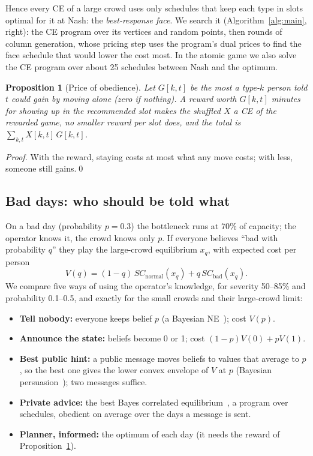 \documentclass{article}
\newtheorem{proposition}{Proposition}
\begin{document}
\smallskip
Hence every CE of a large crowd uses only schedules that keep each type in slots optimal for it at Nash: the
\emph{best-response face}. We search it (Algorithm~\ref{alg:main}, right): the CE program over its vertices and
\RfaceSamples{} random points, then \RfaceRounds{} rounds of column generation, whose pricing step uses the program's
dual prices to find the face schedule that would lower the cost most. In the atomic game we also solve the CE program
over about 25 schedules between Nash and the optimum.

\begin{proposition}[Price of obedience]\label{p3}
Let $G[k,t]$ be the most a type-$k$ person told $t$ could gain by moving alone (zero if nothing). A reward worth
$G[k,t]$ minutes for showing up in the recommended slot makes the shuffled $X$ a CE of the rewarded game, no smaller
reward per slot does, and the total is $\sum_{k,t}X[k,t]\,G[k,t]$.\end{proposition}
\noindent\emph{Proof.} With the reward, staying costs at most what any move costs; with less, someone still gains.\qed

\subsection{Bad days: who should be told what}\label{sec:method-bad}
On a bad day (probability $p=0.3$) the bottleneck runs at 70\% of capacity; the operator knows it, the crowd knows
only $p$. If everyone believes ``bad with probability $q$'' they play the large-crowd equilibrium $x_q$, with expected
cost per person
\begin{equation}\label{eq:V}
V(q)=(1-q)\,SC_{\text{normal}}(x_q)+q\,SC_{\text{bad}}(x_q).
\end{equation}
We compare five ways of using the operator's knowledge, for severity 50--85\% and probability 0.1--0.5, and
exactly for the small crowds and their large-crowd limit:
\begin{itemize}
\item \textbf{Tell nobody:} everyone keeps belief $p$ (a Bayesian NE~\cite{harsanyi}); cost $V(p)$.
\item \textbf{Announce the state:} beliefs become 0 or 1; cost $(1-p)V(0)+pV(1)$.
\item \textbf{Best public hint:} a public message moves beliefs to values that average to $p$, so the best one gives
the lower convex envelope of $V$ at $p$ (Bayesian persuasion~\cite{kamenica}); two messages suffice.
\item \textbf{Private advice:} the best Bayes correlated equilibrium~\cite{bergemann}, a program over \RmenuSize{}
schedules, obedient on average over the days a message is sent.
\item \textbf{Planner, informed:} the optimum of each day (it needs the reward of Proposition~\ref{p3}).
\end{itemize}
\end{document}
